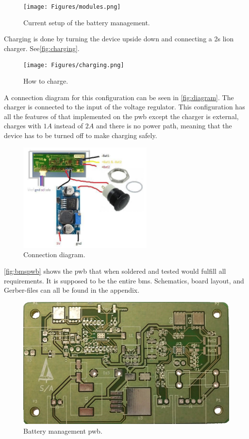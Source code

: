 \begin{figure}[H]
	\centering
	\texttt{[image: Figures/modules.png]}
	\caption{Current setup of the battery management.}
	\label{fig:modules}
\end{figure}


Charging is done by turning the device upside down and connecting a \gls{2s} \gls{lion} charger. See\autoref{fig:charging}.

\begin{figure}[H]
	\centering
	\texttt{[image: Figures/charging.png]}
	\caption{How to charge.}
	\label{fig:charging}
\end{figure}

A connection diagram for this configuration can be seen in \autoref{fig:diagram}. The charger is connected to the input of the voltage regulator. This configuration has all the features of that implemented on the \gls{pwb} except the charger is external, charges with $1A$ instead of $2A$ and there is no power path, meaning that the device has to be turned off to make charging safely.

\begin{figure}[H]
	\centering
	\includegraphics[width=0.6\textwidth]{Figures/diagram.jpg}
	\caption{Connection diagram.}
	\label{fig:diagram}
\end{figure} 

\autoref{fig:bmspwb} shows the \gls{pwb} that when soldered and tested would fulfill all requirements. It is supposed to be the entire \gls{bms}. 
Schematics, board layout, and Gerber-files can all be found in the appendix. %

\begin{figure}[H]
	\centering
	\includegraphics[width=.6\textwidth]{Figures/bmspwb.png}
	\caption{Battery management \gls{pwb}.}
	\label{fig:bmspwb}
\end{figure}